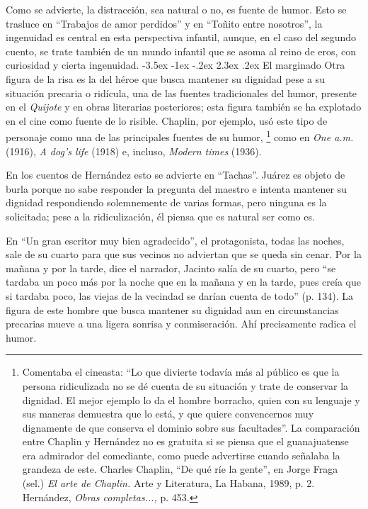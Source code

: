 \documentclass[14pt,twoside,final]{extbook} %
\makeatletter
\let\oldfootnote\footnote
\renewcommand\footnote[1]{%
\oldfootnote{\hspace{1mm}#1}}
\renewcommand\section{\@startsection {section}{1}{\z@}%
                                     {-3.5ex \@plus -1ex \@minus -.2ex}%
                                     {2.3ex \@plus .2ex}%
                                     {\normalfont\large\bfseries\sc}}
\makeatother
\begin{document}
Como se advierte, la distracción, sea natural o no, es fuente de humor. Esto se trasluce en ``Trabajos de amor perdidos'' y en ``Toñito entre nosotros'', la ingenuidad es central en esta perspectiva infantil, aunque, en el caso del segundo cuento, se trate también de un mundo infantil que se asoma al reino de eros, con curiosidad y cierta ingenuidad.
\section{El marginado}\label{sec:el-marginado}
Otra figura de la risa es la del héroe que busca mantener su dignidad pese a su situación precaria o ridícula, una de las fuentes tradicionales del humor, presente en el \emph{Quijote} y en obras literarias posteriores; esta figura también se ha explotado en el cine como fuente de lo risible. Chaplin, por ejemplo, usó este tipo de personaje como una de las principales fuentes de su humor,\footnote{Comentaba el cineasta: ``Lo que divierte todavía más al público es que la persona ridiculizada no se dé cuenta de su situación y trate de conservar la dignidad. El mejor ejemplo lo da el hombre borracho, quien con su lenguaje y sus maneras demuestra que lo está, y que quiere convencernos muy dignamente de que conserva el dominio sobre sus facultades''. La comparación entre Chaplin y Hernández no es gratuita si se piensa que el guanajuatense era admirador del comediante, como puede advertirse cuando señalaba la grandeza de este. Charles Chaplin, ``De qué ríe la gente'', en Jorge Fraga (sel.) \emph{El arte de Chaplin.} Arte y Literatura, La Habana, 1989, p. 2. Hernández, \emph{Obras completas...,} p. 453.} como en \emph{One a.m.} (1916), \emph{A dog's life} (1918) e, incluso, \emph{Modern times} (1936).

En los cuentos de Hernández esto se advierte en ``Tachas''. Juárez es objeto de burla porque no sabe responder la pregunta del maestro e intenta mantener su dignidad respondiendo solemnemente de varias formas, pero ninguna es la solicitada; pese a la ridiculización, él piensa que es natural ser como es.

En ``Un gran escritor muy bien agradecido'', el protagonista, todas las noches, sale de su cuarto para que sus vecinos no adviertan que se queda sin cenar. Por la mañana y por la tarde, dice el narrador, Jacinto salía de su cuarto, pero ``se tardaba un poco más por la noche que en la mañana y en la tarde, pues creía que si tardaba poco, las viejas de la vecindad se darían cuenta de todo'' (p. 134). La figura de este hombre que busca mantener su dignidad aun en circunstancias precarias mueve a una ligera sonrisa y conmiseración. Ahí precisamente radica el humor.
\end{document}
